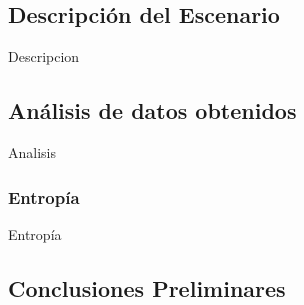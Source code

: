 \subsection{Descripci\'on del Escenario}
	\par Descripcion

\subsection{An\'alisis de datos obtenidos}
	\par Analisis

	\subsubsection{Entrop\'ia}
		\par Entrop\'ia

\subsection{Conclusiones Preliminares}